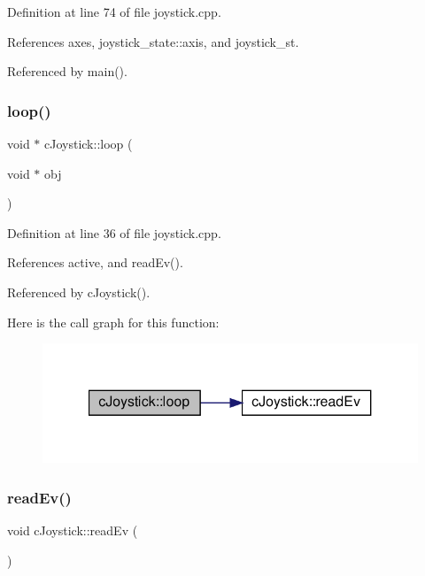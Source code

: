 Definition at line 74 of file joystick.\+cpp.



References axes, joystick\+\_\+state\+::axis, and joystick\+\_\+st.



Referenced by main().

\mbox{\label{classc_joystick_aafa52c2e4d67c71f3d1e31b80d1dd324}} 
\subsubsection{\texorpdfstring{loop()}{loop()}}
{\footnotesize\ttfamily void $\ast$ c\+Joystick\+::loop (\begin{DoxyParamCaption}\item[{void $\ast$}]{obj }\end{DoxyParamCaption})\hspace{0.3cm}{\ttfamily [static]}}



Definition at line 36 of file joystick.\+cpp.



References active, and read\+Ev().



Referenced by c\+Joystick().

Here is the call graph for this function\+:\nopagebreak
\begin{figure}[H]
\begin{center}
\leavevmode
\includegraphics[width=321pt]{classc_joystick_aafa52c2e4d67c71f3d1e31b80d1dd324_cgraph}
\end{center}
\end{figure}
\mbox{\label{classc_joystick_a8c04dc903aac9588db3b3e81f495705a}} 
\subsubsection{\texorpdfstring{read\+Ev()}{readEv()}}
{\footnotesize\ttfamily void c\+Joystick\+::read\+Ev (\begin{DoxyParamCaption}{ }\end{DoxyParamCaption})}



